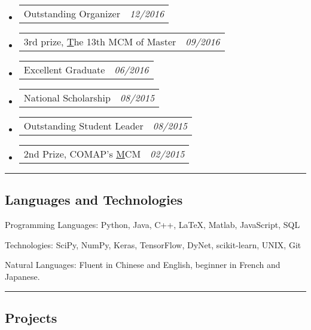 \documentclass[10pt,letterpaper]{article}
\makeatletter
\newenvironment{indentsection}[1]%
{\begin{list}{}%
	{\setlength{\leftmargin}{#1}}%
	\item[]%
}
{\end{list}}
\newcommand{\headerrow}[2]
{\begin{tabular*}{\linewidth}{l@{\extracolsep{\fill}}r}
	#1 &
	#2 \\
\end{tabular*}}
\makeatother
\begin{document}
\begin{itemize}
	\parskip=0.1em
	
	\item 
	\headerrow
		{Outstanding Organizer}
		{\emph{12/2016}}
	\item 
	\headerrow
		{3rd prize, \href{http://gmcm.seu.edu.cn/}The 13th MCM of Master}
		{\emph{09/2016}}
	\item 
	\headerrow
		{Excellent Graduate}
		{\emph{06/2016}}
	\item 
	\headerrow
		{National Scholarship}
		{\emph{08/2015}}	
	\item 
	\headerrow
		{Outstanding Student Leader}
		{\emph{08/2015}}
	\item 
	\headerrow
		{2nd Prize, COMAP's \href{https://www.comap.com/undergraduate/contests/}MCM}
		{\emph{02/2015}}
\end{itemize}

\hrule
\vspace{-0.4em}
\subsection*{Languages and Technologies}

\begin{indentsection}{\parindent}
\begin{description*}
	\item[Programming Languages:]
	Python, Java, C++, \LaTeX, Matlab, JavaScript, SQL
	\item[Technologies:]
	SciPy, NumPy, Keras, TensorFlow, DyNet, scikit-learn, UNIX, Git
	\item[Natural Languages:]
	Fluent in Chinese and English, beginner in French and Japanese.
\end{description*}
\end{indentsection}

\hrule
\vspace{-0.4em}
\subsection*{Projects}
\end{document}
